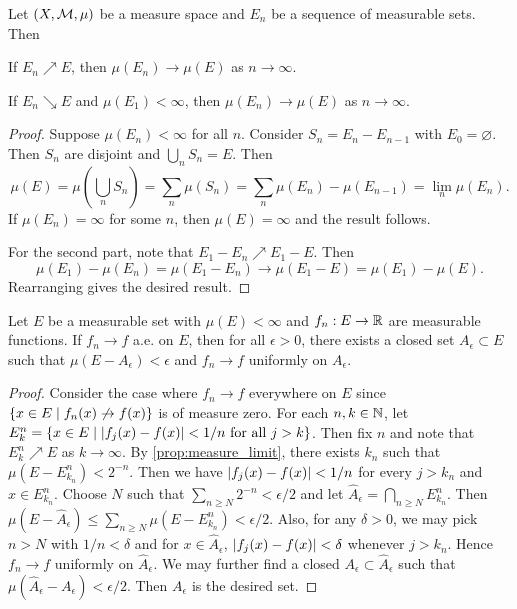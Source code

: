 \begin{proposition}\label{prop:measure_limit}
    Let $(X,\mathcal{M},\mu)$ be a measure space and $E_n$ be a sequence of 
    measurable sets. Then 
    \begin{thmenum}
        \item If $E_n\nearrow E$, then $\mu(E_n)\to\mu(E)$ as $n\to\infty$. 
        \item If $E_n\searrow E$ and $\mu(E_1)<\infty$, then $\mu(E_n)\to\mu(E)$ as $n\to\infty$.
    \end{thmenum}
\end{proposition}
\begin{proof}
    Suppose $\mu(E_n)<\infty$ for all $n$. Consider $S_n = E_n - E_{n-1}$ with 
    $E_0 = \varnothing$. Then $S_n$ are disjoint and $\bigcup_n S_n = E$. Then 
    \begin{equation*}
        \mu(E) = \mu(\bigcup_n S_n) = \sum_n \mu(S_n) = \sum_n \mu(E_n) - \mu(E_{n-1}) = \lim_n \mu(E_n).
    \end{equation*}
    If $\mu(E_n) = \infty$ for some $n$, then $\mu(E) = \infty$ and the result 
    follows.

    For the second part, note that $E_1-E_n\nearrow E_1-E$. Then 
    \begin{equation*}
        \mu(E_1) - \mu(E_n) = \mu(E_1-E_n) \to \mu(E_1-E) = \mu(E_1) - \mu(E).
    \end{equation*}
    Rearranging gives the desired result.
\end{proof}

\begin{theorem}[Egorov]
    Let $E$ be a measurable set with $\mu(E)<\infty$ and $f_n:E\to\mathbb{R}$ are 
    measurable functions. If $f_n\to f$ a.e. on $E$, then for all 
    $\epsilon>0$, there exists a closed set $A_\epsilon\subset E$ such 
    that $\mu(E-A_\epsilon)<\epsilon$ and $f_n\to f$ uniformly on $A_\epsilon$.
\end{theorem}
\begin{proof}
    Consider the case where $f_n\to f$ everywhere on $E$ since 
    $\left\{ x\in E \;\middle\vert\; f_n(x)\not\to f(x) \right\}$ is of measure zero. For each 
    $n,k\in\mathbb{N}$, let $E_k^n = \left\{ x\in E \;\middle\vert\; \left\lvert {f_j(x)-f(x)} \right\rvert<1/n \text{ for all }j>k \right\}$. 
    Then fix $n$ and note that $E_k^n\nearrow E$ as $k\to\infty$. By 
    \cref{prop:measure_limit}, there exists $k_n$ such that $\mu(E-E_{k_n}^n)<2^{-n}$. 
    Then we have $\left\lvert {f_j(x)-f(x)} \right\rvert<1/n$ for every $j>k_n$ and $x\in E_{k_n}^n$. 
    Choose $N$ such that $\sum_{n\geq N}2^{-n}<\epsilon/2$ and let 
    $\hat{A}_\epsilon = \bigcap_{n\geq N} E^n_{k_n}$. Then 
    $\mu(E-\hat{A}_\epsilon)\leq \sum_{n\geq N}\mu(E-E^n_{k_n})<\epsilon/2$. 
    Also, for any $\delta>0$, we may pick $n>N$ with $1/n<\delta$ and 
    for $x\in\hat{A}_\epsilon$, $\left\lvert {f_j(x)-f(x)} \right\rvert<\delta$ whenever $j>k_n$. 
    Hence $f_n\to f$ uniformly on $\hat{A}_\epsilon$. We may further 
    find a closed $A_\epsilon\subset\hat{A}_\epsilon$ such that 
    $\mu(\hat{A}_\epsilon-A_\epsilon)<\epsilon/2$. Then $A_\epsilon$ 
    is the desired set.
\end{proof}

